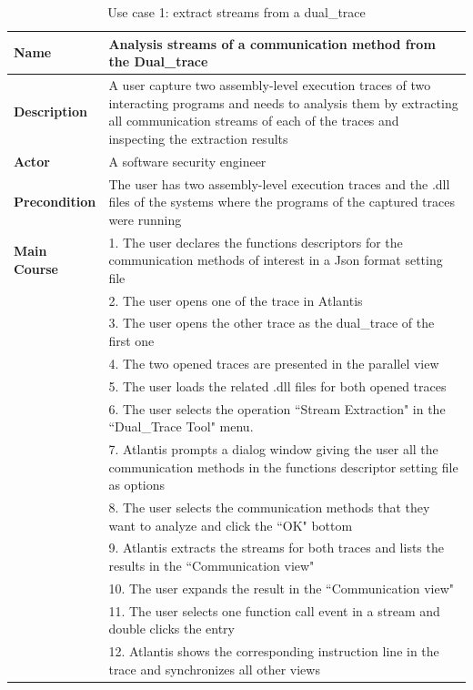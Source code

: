 \begin{table}[H]
  \centering
  \caption{Use case 1: extract streams from a dual\_trace}
  \label{usecase1}
  \begin{tabular}{|l|p{13cm}|}
      \hline
       \textbf{Name} & Analysis streams of a communication method from the Dual\_trace\\
       \hline
       \textbf{Description} & A user capture two assembly-level execution traces of two interacting programs and needs to analysis them by extracting all communication streams of each of the traces and inspecting the extraction results \\
       \hline
              \textbf{Actor} & A software security engineer \\
       \hline
       \textbf{Precondition} & The user has two assembly-level execution traces and the .dll files of the systems where the programs of the captured traces were running\\
       \hline
       \textbf{Main Course}& 1. The user declares the functions descriptors for the communication methods of interest in a Json format setting file\\
        & 2. The user opens one of the trace in Atlantis\\
       &  3. The user opens the other trace as the dual\_trace of the first one\\
       & 4. The two opened traces are presented in the parallel view\\
       & 5. The user loads the related .dll files for both opened traces\\
       & 6. The user selects the operation ``Stream Extraction" in the ``Dual\_Trace Tool" menu.\\
       & 7. Atlantis prompts a dialog window giving the user all the communication methods in the functions descriptor setting file as options\\
       & 8. The user selects the communication methods that they want to analyze and click the ``OK" bottom\\
       & 9. Atlantis extracts the streams for both traces and lists the results in the ``Communication view"\\
       & 10. The user expands the result in the ``Communication view"\\
       & 11. The user selects one function call event in a stream and double clicks the entry\\
       & 12. Atlantis shows the corresponding instruction line in the trace and synchronizes all other views\\
      \hline               
  \end{tabular}
\end{table}



